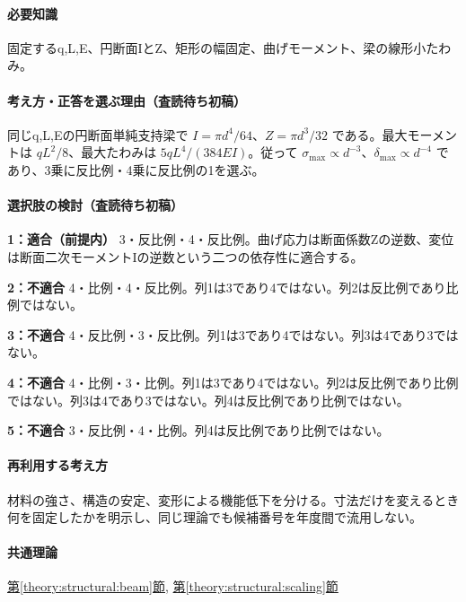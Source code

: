 \paragraph{必要知識} 固定するq,L,E、円断面IとZ、矩形の幅固定、曲げモーメント、梁の線形小たわみ。

\paragraph{考え方・正答を選ぶ理由（査読待ち初稿）} 同じq,L,Eの円断面単純支持梁で \(I=\pi d^4/64\)、\(Z=\pi d^3/32\) である。最大モーメントは \(qL^2/8\)、最大たわみは \(5qL^4/(384EI)\)。従って \(\sigma_{\max}\propto d^{-3}\)、\(\delta_{\max}\propto d^{-4}\) であり、3乗に反比例・4乗に反比例の1を選ぶ。

\paragraph{選択肢の検討（査読待ち初稿）}\mbox{}\par

\noindent\textbf{1：適合（前提内）} 3・反比例・4・反比例。曲げ応力は断面係数Zの逆数、変位は断面二次モーメントIの逆数という二つの依存性に適合する。\par

\noindent\textbf{2：不適合} 4・比例・4・反比例。列1は3であり4ではない。列2は反比例であり比例ではない。\par

\noindent\textbf{3：不適合} 4・反比例・3・反比例。列1は3であり4ではない。列3は4であり3ではない。\par

\noindent\textbf{4：不適合} 4・比例・3・比例。列1は3であり4ではない。列2は反比例であり比例ではない。列3は4であり3ではない。列4は反比例であり比例ではない。\par

\noindent\textbf{5：不適合} 3・反比例・4・比例。列4は反比例であり比例ではない。\par

\paragraph{再利用する考え方} 材料の強さ、構造の安定、変形による機能低下を分ける。寸法だけを変えるとき何を固定したかを明示し、同じ理論でも候補番号を年度間で流用しない。

\paragraph{共通理論} \hyperref[theory:structural:beam]{第\ref*{theory:structural:beam}節}, \hyperref[theory:structural:scaling]{第\ref*{theory:structural:scaling}節}

